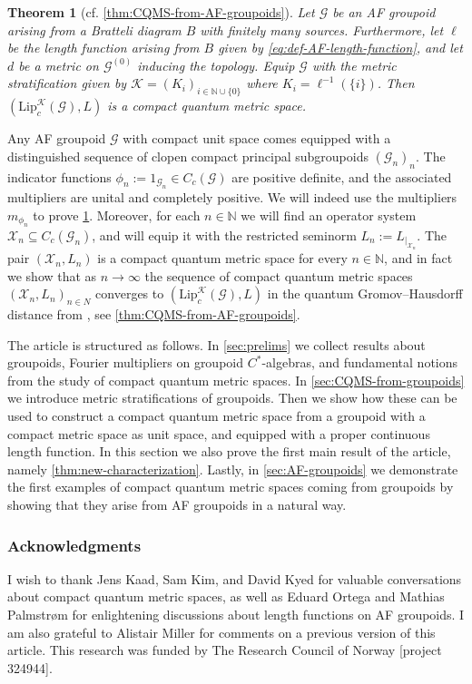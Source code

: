 \documentclass[11pt,a4paper,oneside,final,reqno]{amsart}
\newtheorem{introtheorem}{Theorem}
\theoremstyle{definition}
\newcommand{\G}{\mathcal{G}}
\newcommand{\Go}{\mathcal{G}^{(0)}}
\newcommand{\cK}{\mathcal{K}}
\newcommand{\cX}{\mathcal{X}}
\newcommand{\Lip}{\mathrm{Lip}}
\newcommand{\N}{\mathbb{N}}
\numberwithin{equation}{section}
\begin{document}
	\begin{introtheorem}[cf. \cref{thm:CQMS-from-AF-groupoids}]\label{thm:second-intro-theorem}
		Let $\G$ be an AF groupoid arising from a Bratteli diagram $B$ with finitely many sources. 
		Furthermore, let $\ell$ be the length function arising from $B$ given by \eqref{eq:def-AF-length-function}, and let $d$ be a metric on $\Go$ inducing the topology. 
		Equip $\G$ with the metric stratification given by $\cK = (K_i)_{i \in \N \cup \{0\}}$ where $K_i = \ell^{-1}(\{i\})$. Then $(\Lip_c^{\cK}(\G), L)$  
		is a compact quantum metric space. 
	\end{introtheorem}
	
	Any AF groupoid $\G$ with compact unit space comes equipped with a distinguished sequence of clopen compact principal subgroupoids $(\G_n)_n$. The indicator functions $\phi_n := 1_{\G_n} \in C_c(\G)$ are positive definite, and the associated multipliers are unital and completely positive. We will indeed use the multipliers $m_{\phi_n}$ to prove \cref{thm:second-intro-theorem}. 
	Moreover, for each $n \in \N$ we will find an operator system $\cX_n \subseteq C_c(\G_n)$, and will equip it with the restricted seminorm $L_n := L_{\vert_{\cX_n}}$. 
	The pair $(\cX_n, L_n)$ is a compact quantum metric space for every $n \in \N$, and in fact we show that as $n\to \infty$ the sequence of compact quantum metric spaces $(\cX_n, L_n)_{n\in N}$ converges to $(\Lip_c^\cK(\G), L)$  in the quantum Gromov--Hausdorff distance from \cite{Rieffel2004qGH},  
	see \cref{thm:CQMS-from-AF-groupoids}. 
	
	
	
	The article is structured as follows. In \cref{sec:prelims} we collect results about groupoids, Fourier multipliers on groupoid $C^*$-algebras, and fundamental notions from the study of compact quantum metric spaces. 
	In \cref{sec:CQMS-from-groupoids} we introduce metric stratifications of groupoids. Then we show how these can be used to construct a compact quantum metric space from a groupoid with a compact metric space as unit space, and equipped with a  proper continuous length function.  In this section we also prove the first main result of the article, namely \cref{thm:new-characterization}. Lastly, in \cref{sec:AF-groupoids} we demonstrate the first examples of compact quantum metric spaces coming from groupoids by showing that they arise from AF groupoids in a natural way. 
	
	
 \subsubsection*{Acknowledgments} I  wish to thank Jens Kaad,  Sam Kim, and David Kyed for valuable conversations about compact quantum metric spaces, as well as Eduard Ortega and Mathias Palmstrøm for enlightening discussions about length functions on AF groupoids. 
 I am also grateful to Alistair Miller for comments on a previous version of this article. 
 This research was funded by The Research Council of Norway [project 324944].
	
\end{document}
